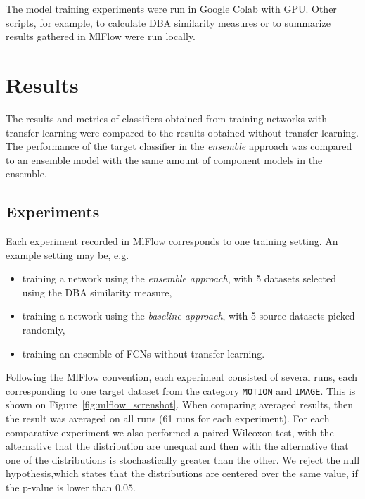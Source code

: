 \documentclass[a4paper,11pt,twoside]{report}
\theoremstyle{definition}
\begin{document}
The model training experiments were run in Google Colab with GPU. Other scripts, for example, to calculate DBA similarity measures or to summarize results gathered in MlFlow were run locally.
\chapter{Results}\label{chapter:results}
The results and metrics of classifiers obtained from training networks with transfer learning were compared to the results obtained without transfer learning. The performance of the target classifier in the\textit{ ensemble }approach was compared to an ensemble model with the same amount of component models in the ensemble.

\section{Experiments}
Each experiment recorded in MlFlow corresponds to one training setting. An example setting may be, e.g.~\begin{itemize}
\item training a network using the \textit{ensemble approach}, with 5 datasets selected using the DBA similarity measure,
 \item training a network using the \textit{baseline approach}, with 5 source datasets picked randomly,
 \item training an ensemble of FCNs without transfer learning.

\end{itemize}
Following the MlFlow convention, each experiment consisted of several runs, each corresponding to one target dataset from the category \texttt{MOTION} and \texttt{IMAGE}. This is shown on Figure~\ref{fig:mlflow_screnshot}. When comparing averaged results, then the result was averaged on all runs (61 runs for each experiment).
For each comparative experiment we also performed a paired Wilcoxon test, with the alternative that the distribution are unequal and then with the alternative that one of the distributions is stochastically greater than the other.
We reject the null hypothesis,which states that the distributions are centered over the same value, if the p-value is lower than $0.05$.
\FloatBarrier
\end{document}
